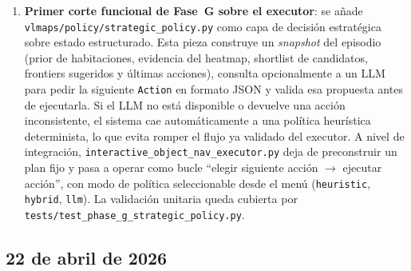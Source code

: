 \begin{enumerate}
  \item \textbf{Primer corte funcional de Fase~G sobre el executor}: se añade
        \texttt{vlmaps/policy/strategic\_policy.py} como capa de decisión
        estratégica sobre estado estructurado. Esta pieza construye un
        \emph{snapshot} del episodio (prior de habitaciones, evidencia del
        heatmap, shortlist de candidatos, frontiers sugeridos y últimas
        acciones), consulta opcionalmente a un LLM para pedir la siguiente
        \texttt{Action} en formato JSON y valida esa propuesta antes de
        ejecutarla. Si el LLM no está disponible o devuelve una acción
        inconsistente, el sistema cae automáticamente a una política
        heurística determinista, lo que evita romper el flujo ya validado del
        executor. A nivel de integración, \texttt{interactive\_object\_nav\_executor.py}
        deja de preconstruir un plan fijo y pasa a operar como bucle
        ``elegir siguiente acción $\rightarrow$ ejecutar acción'', con modo de
        política seleccionable desde el menú (\texttt{heuristic},
        \texttt{hybrid}, \texttt{llm}). La validación unitaria queda cubierta
        por \texttt{tests/test\_phase\_g\_strategic\_policy.py}.

\end{enumerate}

\subsection*{22 de abril de 2026}

